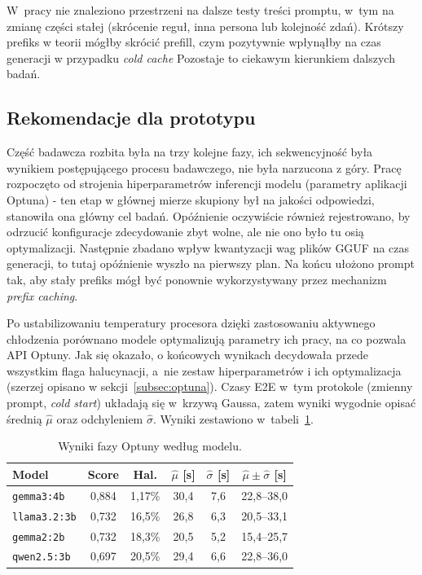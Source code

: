 W~pracy nie znaleziono przestrzeni na dalsze testy treści promptu, w~tym na
zmianę części stałej (skrócenie reguł, inna persona lub kolejność zdań).
Krótszy prefiks w teorii mógłby skrócić prefill, czym pozytywnie wpłynąłby na czas generacji w przypadku \emph{cold cache}
Pozostaje to ciekawym kierunkiem dalszych badań.


\subsection{Rekomendacje dla prototypu}
\label{subsec:rekomendacja}


Część badawcza rozbita była na trzy kolejne fazy, ich sekwencyjność była wynikiem postępującego procesu badawczego, nie była narzucona z góry. Pracę rozpoczęto od strojenia hiperparametrów inferencji modelu (parametry aplikacji Optuna)
- ten etap w głównej mierze skupiony był na jakości
odpowiedzi, stanowiła ona główny cel badań. Opóźnienie oczywiście również rejestrowano,
by odrzucić konfiguracje zdecydowanie zbyt wolne, ale nie ono było tu osią
optymalizacji. Następnie zbadano wpływ kwantyzacji wag plików GGUF na czas generacji,
to tutaj opóźnienie wyszło na pierwszy plan. Na końcu ułożono prompt tak,
aby stały prefiks mógł być ponownie wykorzystywany przez mechanizm
\emph{prefix caching}.

Po ustabilizowaniu temperatury procesora dzięki zastosowaniu aktywnego chłodzenia porównano
modele optymalizują parametry ich pracy, na co pozwala API Optuny. Jak się okazało, o końcowych wynikach decydowała przede wszystkim flaga
halucynacji, a~nie zestaw hiperparametrów i ich optymalizacja (szerzej opisano w sekcji~\ref{subsec:optuna}). Czasy E2E w~tym protokole
(zmienny prompt, \emph{cold start}) układają się w~krzywą Gaussa, zatem wyniki
wygodnie opisać średnią $\hat\mu$ oraz odchyleniem $\hat\sigma$. Wyniki
zestawiono w~tabeli~\ref{tab:wyniki_finalne}.

\begin{table}[H]
  \centering
  \caption{Wyniki fazy Optuny według modelu.}
  \label{tab:wyniki_finalne}
  \small
  \begin{tabular}{lccccc}
    \hline
    Model & Score & Hal. & $\hat\mu$ [s] & $\hat\sigma$ [s]
          & $\hat\mu\pm\hat\sigma$ [s] \\
    \hline
    \texttt{gemma3:4b}   & 0{,}884 & 1{,}17\% & 30{,}4 & 7{,}6 & 22{,}8--38{,}0 \\
    \texttt{llama3.2:3b} & 0{,}732 & 16{,}5\% & 26{,}8 & 6{,}3 & 20{,}5--33{,}1 \\
    \texttt{gemma2:2b}   & 0{,}732 & 18{,}3\% & 20{,}5 & 5{,}2 & 15{,}4--25{,}7 \\
    \texttt{qwen2.5:3b}  & 0{,}697 & 20{,}5\% & 29{,}4 & 6{,}6 & 22{,}8--36{,}0 \\
    \hline
  \end{tabular}
\end{table}

